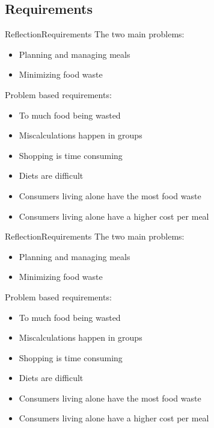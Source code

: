 \subsection{Requirements}
\begin{frame}{Reflection}{Requirements}%
	The two main problems:
	\begin{itemize}
		\item Planning and managing meals
		\item Minimizing food waste
	\end{itemize}	
	Problem based requirements:
	\begin{itemize}
		\item To much food being wasted
		\item Miscalculations happen in groups
		\item Shopping is time consuming
		\item Diets are difficult
		\item Consumers living alone have the most food waste
		\item Consumers living alone have a higher cost per meal
	\end{itemize}

\end{frame}
\begin{frame}{Reflection}{Requirements}%
The two main problems:
	\begin{itemize} \color{dkgreen}
		\item Planning and managing meals
		\item Minimizing food waste
	\end{itemize}
	Problem based requirements:
	\begin{itemize}
		\item {\color{dkgreen}To much food being wasted}
		\item {\color{red}Miscalculations happen in groups}
		\item {\color{orange}Shopping is time consuming}
		\item {\color{orange}Diets are difficult}
		\item {\color{orange}Consumers living alone have the most food waste}
		\item {\color{orange}Consumers living alone have a higher cost per meal}
	\end{itemize}
\end{frame}

